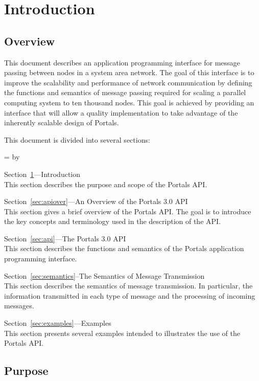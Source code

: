\documentclass{sand-report}
\newcommand{\mydesclabel}[1]{\mbox{\textbf{#1}}\hfil}
\newenvironment{mydesc}%
{\begin{list}{}{%
      \renewcommand{\makelabel}{\mydesclabel}%
      \labelwidth=5\parindent%
      \leftmargin=\labelwidth%
      \advance \leftmargin by \labelsep%
      \setlength{\itemsep}{\smallskipamount}\setlength{\parsep}{0pt}}}%
  {\end{list}}
\begin{document}
\section{Introduction}\label{sec:intro}

\subsection{Overview}

This document describes an application programming interface for
message passing between nodes in a system area network.  The goal of
this interface is to improve the scalability and performance of
network communication by defining the functions and semantics of
message passing required for scaling a parallel computing system to
ten thousand nodes.  This goal is achieved by providing an interface
that will allow a quality implementation to take advantage of the
inherently scalable design of Portals.

This document is divided into several sections:
\begin{mydesc}
\item[Section~\ref{sec:intro}---Introduction]~\\
  This section describes the purpose and scope of the Portals API.
\item[Section~\ref{sec:apiover}---An Overview of the Portals 3.0 API]~\\
  This section gives a brief overview of the Portals API.  The goal is 
  to introduce the key concepts and terminology used in the
  description of the API.
\item[Section~\ref{sec:api}---The Portals 3.0 API]~\\
  This section describes the functions and semantics of the Portals
  application programming interface.
\item[Section~\ref{sec:semantics}--The Semantics of Message
  Transmission]~\\
  This section describes the semantics of message transmission.  In
  particular, the information transmitted in each type of message and
  the processing of incoming messages.
\item[Section~\ref{sec:examples}---Examples]~\\
  This section presents several examples intended to illustrates the
  use of the Portals API.
\end{mydesc}

\subsection{Purpose}
\end{document}
